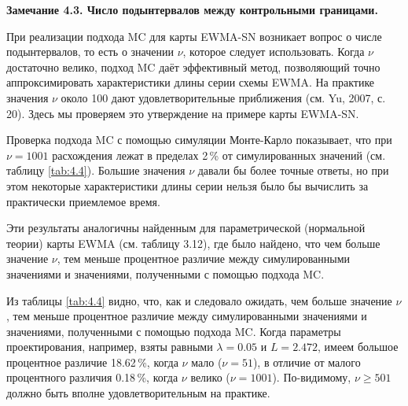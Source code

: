 \noindent\textbf{Замечание 4.3. Число подынтервалов между контрольными границами.}

При реализации подхода MC для карты EWMA-SN возникает вопрос о числе подынтервалов, то есть о значении \(\nu\), которое следует использовать. Когда \(\nu\) достаточно велико, подход MC даёт эффективный метод, позволяющий точно аппроксимировать характеристики длины серии схемы EWMA. На практике значения \(\nu\) около 100 дают удовлетворительные приближения (см. Yu, 2007, с. 20). Здесь мы проверяем это утверждение на примере карты EWMA-SN.

Проверка подхода MC с помощью симуляции Монте-Карло показывает, что при \(\nu = 1001\) расхождения лежат в пределах 2\,\% от симулированных значений (см. таблицу \ref{tab:4.4}). Большие значения \(\nu\) давали бы более точные ответы, но при этом некоторые характеристики длины серии нельзя было бы вычислить за практически приемлемое время.

Эти результаты аналогичны найденным для параметрической (нормальной теории) карты EWMA (см. таблицу 3.12), где было найдено, что чем больше значение \(\nu\), тем меньше процентное различие между симулированными значениями и значениями, полученными с помощью подхода MC.

Из таблицы \ref{tab:4.4} видно, что, как и следовало ожидать, чем больше значение \(\nu\), тем меньше процентное различие между симулированными значениями и значениями, полученными с помощью подхода MC. Когда параметры проектирования, например, взяты равными \(\lambda = 0.05\) и \(L = 2.472\), имеем большое процентное различие 18.62\,\%, когда \(\nu\) мало (\(\nu = 51\)), в отличие от малого процентного различия 0.18\,\%, когда \(\nu\) велико (\(\nu = 1001\)). По-видимому, \(\nu \ge 501\) должно быть вполне удовлетворительным на практике.

